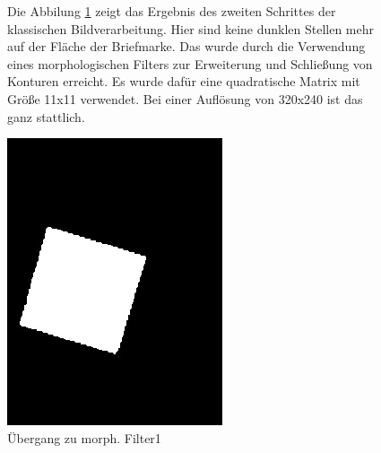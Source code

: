 \documentclass[12pt,toc=bib,toc=listof]{scrreprt}
\begin{document}
\begin{figure}[h]
\begin{minipage}[t]{.75\linewidth}

Die Abbilung \ref{fig:bv_morph1} zeigt das Ergebnis des zweiten Schrittes der klassischen Bildverarbeitung. Hier sind keine dunklen Stellen mehr auf der Fläche der Briefmarke. Das wurde durch die Verwendung eines morphologischen Filters zur Erweiterung und Schließung von Konturen erreicht. Es wurde dafür eine quadratische Matrix mit Größe 11x11 verwendet. Bei einer Auflösung von 320x240 ist das ganz stattlich.
\end{minipage}
\hfill
\begin{minipage}[t]{.2\linewidth}
\strut\vspace*{-\baselineskip}
\newline
  \includegraphics[width=\linewidth]{./bilder/bin1morph}
  \caption{Übergang zu morph. Filter1}
  \label{fig:bv_morph1}
\end{minipage}
\end{figure}
\end{document}
